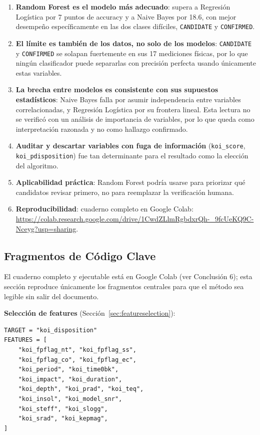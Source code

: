 \documentclass[10pt,journal]{IEEEtran}
\begin{document}
  \begin{enumerate}
    \item \textbf{Random Forest es el modelo m\'as adecuado}: supera a Regresi\'on Log\'istica por 7 puntos de accuracy y a Naive Bayes por 18.6, con mejor desempe\~no espec\'ificamente en las dos clases dif\'iciles, \texttt{CANDIDATE} y \texttt{CONFIRMED}.
    \item \textbf{El l\'imite es tambi\'en de los datos, no solo de los modelos}: \texttt{CANDIDATE} y \texttt{CONFIRMED} se solapan fuertemente en sus 17 mediciones f\'isicas, por lo que ning\'un clasificador puede separarlas con precisi\'on perfecta usando \'unicamente estas variables.
    \item \textbf{La brecha entre modelos es consistente con sus supuestos estad\'isticos}: Naive Bayes falla por asumir independencia entre variables correlacionadas, y Regresi\'on Log\'istica por su frontera lineal. Esta lectura no se verific\'o con un an\'alisis de importancia de variables, por lo que queda como interpretaci\'on razonada y no como hallazgo confirmado.
    \item \textbf{Auditar y descartar variables con fuga de informaci\'on} (\texttt{koi\_score}, \texttt{koi\_pdisposition}) fue tan determinante para el resultado como la elecci\'on del algoritmo.
    \item \textbf{Aplicabilidad pr\'actica}: Random Forest podr\'ia usarse para priorizar qu\'e candidatos revisar primero, no para reemplazar la verificaci\'on humana.
    \item \textbf{Reproducibilidad}: cuaderno completo en Google Colab: \url{https://colab.research.google.com/drive/1CwdZLlmRgbdxrQh-_9fcUeKQ9C-Nceyg?usp=sharing}.
  \end{enumerate}

  \appendix

  \subsection{Fragmentos de C\'odigo Clave}

  El cuaderno completo y ejecutable est\'a en Google Colab (ver Conclusi\'on 6); esta secci\'on reproduce \'unicamente los fragmentos centrales para que el m\'etodo sea legible sin salir del documento.

  \textbf{Selecci\'on de features} (Secci\'on~\ref{sec:featureselection}):
  \begin{lstlisting}
TARGET = "koi_disposition"
FEATURES = [
    "koi_fpflag_nt", "koi_fpflag_ss",
    "koi_fpflag_co", "koi_fpflag_ec",
    "koi_period", "koi_time0bk",
    "koi_impact", "koi_duration",
    "koi_depth", "koi_prad", "koi_teq",
    "koi_insol", "koi_model_snr",
    "koi_steff", "koi_slogg",
    "koi_srad", "koi_kepmag",
]
  \end{lstlisting}
\end{document}

